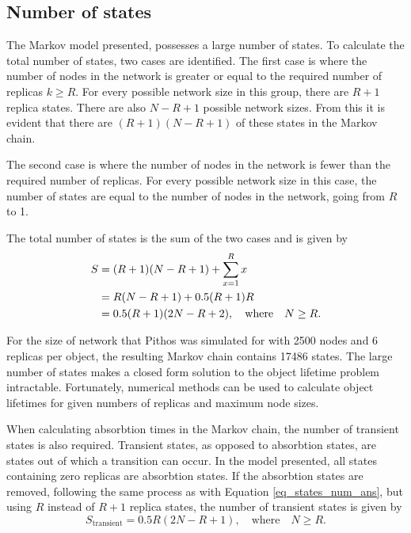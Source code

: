 \subsection{Number of states}

The Markov model presented, possesses a large number of states. To calculate the total number of states, two cases are identified. The first case is where the number of nodes in the network is greater or equal to the required number of replicas $k \geq R$. For every possible network size in this group, there are $R+1$ replica states. There are also $N - R + 1$ possible network sizes. From this it is evident that there are $(R+1)(N - R + 1)$ of these states in the Markov chain.

The second case is where the number of nodes in the network is fewer than the required number of replicas. For every possible network size in this case, the number of states are equal to the number of nodes in the network, going from $R$ to 1.

The total number of states is the sum of the two cases and is given by
%
\begin{align}
       S & = (R+1)(N - R + 1) + \sum_{x=1}^{R} x\label{eq_states_num_init}\\
         & = R(N - R + 1) + 0.5 (R + 1) R\notag\\
         & = 0.5 (R + 1) (2 N - R + 2), \quad\textrm{where}\quad N \geq R. \label{eq_states_num_ans}
\end{align}

For the size of network that Pithos was simulated for with 2500 nodes and 6 replicas per object, the resulting Markov chain contains 17486 states. The large number of states makes a closed form solution to the object lifetime problem intractable. Fortunately, numerical methods can be used to calculate object lifetimes for given numbers of replicas and maximum node sizes.

When calculating absorbtion times in the Markov chain, the number of transient states is also required. Transient states, as opposed to absorbtion states, are states out of which a transition can occur. In the model presented, all states containing zero replicas are absorbtion states. If the absorbtion states are removed, following the same process as with Equation \eqref{eq_states_num_ans}, but using $R$ instead of $R+1$ replica states, the number of transient states is given by
%
\begin{equation}
S_\textrm{transient} = 0.5 R (2 N - R + 1), \quad\textrm{where}\quad N \geq R. \label{eq_transient_states_num}
\end{equation}

